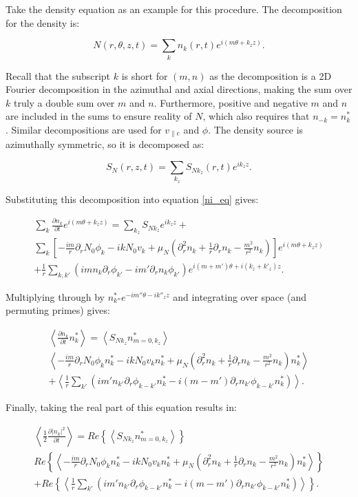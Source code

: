 \documentclass[showpacs,preprintnumbers,amsmath,amssymb,superscriptaddress]{revtex4}
\def\beq{\begin{equation}}
\def\eeq{\end{equation}}
\def\beqar{\begin{eqnarray}}
\def\eeqar{\end{eqnarray}}
\newcommand{\pdiff}[2]{\frac{\partial#1}{\partial#2}}
\newcommand{\pdr}{\partial_r}
\newcommand{\pdrr}{\partial^2_r}
\newcommand{\vpe}{v_{\parallel e}}
\begin{document}
Take the density equation as an example for this procedure. The decomposition for the density is:

\beq
\label{density_decomp}
N(r,\theta,z,t) = \sum_{k} n_k(r,t) e^{i(m \theta + k_z z)}.
\eeq

Recall that the subscript $k$ is short for $(m,n)$ as the decomposition is a 2D Fourier decomposition in the azimuthal and axial directions, making the sum over $k$ truly
a double sum over $m$ and $n$. Furthermore, positive and negative
$m$ and $n$ are included in the sums to ensure reality of $N$, which also requires that $n_{-k} = n_k^*$.
Similar decompositions are used for $\vpe$ and $\phi$. The density source is azimuthally symmetric, so it is decomposed as:

\beq
\label{source_decomp}
S_N(r,z,t) = \sum_{k_z} S_{N k_z}(r,t) e^{i k_z z}.
\eeq

Substituting this decomposition into equation \ref{ni_eq} gives:

\beqar
\label{density_eq_fourier}
\sum_{k} \pdiff{n_k}{t} e^{i(m \theta + k_z z)} = \sum_{k_z} S_{N k_z} e^{i k_z z} + \nonumber \\
\sum_{k} \left[ -\frac{i m}{r} \pdr N_0 \phi_k - i k N_0 v_k + \mu_N(\pdrr n_k + \frac{1}{r} \pdr n_k - \frac{m^2}{r^2} n_k) \right] e^{i(m \theta + k_z z)} \nonumber \\
+ \frac{1}{r} \sum_{k,k'} (i m n_k \pdr \phi_{k'} - i m' \pdr n_k \phi_{k'}) e^{i (m + m') \theta + i (k_z + k'_z) z}.
\eeqar

Multiplying through by $n_{k''}^* e^{- i m'' \theta - i k''_z z}$ and integrating over space (and permuting primes) gives:

\beqar
\label{density_evolution}
\left< \pdiff{n_k}{t} n_k^* \right> = \left< S_{N k_z} n_{m=0,k_z}^* \right>  \nonumber \\
\left< -\frac{i m}{r} \pdr N_0 \phi_k n_k^* - i k N_0 v_k n_k^* + \mu_N( \pdrr n_k + \frac{1}{r} \pdr n_k - \frac{m^2}{r^2} n_k) n_k^*  \right> \nonumber \\
+ \left< \frac{1}{r} \sum_{k'} \left( i m' n_{k'} \pdr \phi_{k-k'} n_k^*  - i (m - m') \pdr n_{k'} \phi_{k-k'} n_k^*        \right) \right>.
\eeqar

Finally, taking the real part of this equation results in:

\beqar
\label{real_density_evolution}
\left< \frac{1}{2} \pdiff{|n_k|^2}{t} \right> = Re \left\{ \left< S_{N k_z} n_{m=0,k_z}^* \right> \right\} \nonumber \\
Re \left\{ \left< -\frac{i m}{r} \pdr N_0 \phi_k n_k^* - i k N_0 v_k n_k^* + \mu_N( \pdrr n_k + \frac{1}{r} \pdr n_k - \frac{m^2}{r^2} n_k) n_k^* \right> \right\} \nonumber \\
+ Re \left\{ \left< \frac{1}{r} \sum_{k'} \left( i m' n_{k'} \pdr \phi_{k-k'} n_k^*  - i (m - m') \pdr n_{k'} \phi_{k-k'} n_k^*        \right) \right> \right\}.
\eeqar
\end{document}
